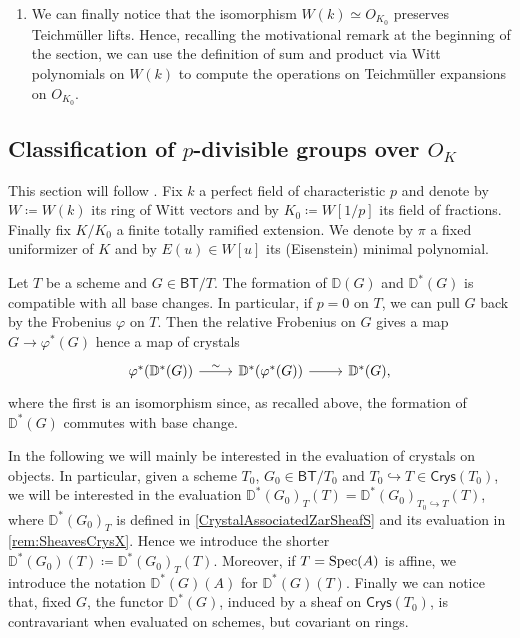 \begin{rem}[]
\begin{enumerate}
\item We can finally notice that the isomorphism $W(k) \simeq O_{K_0}$ preserves
	Teichmüller lifts. Hence, recalling the motivational remark at the beginning
	of the section, we can use the definition of sum and product via
	Witt polynomials on $W(k)$ to compute the operations on
	Teichmüller expansions on $O_{K_0}$.
\end{enumerate}
\end{rem}



\subsection{Classification of \texorpdfstring{$p$}{p}-divisible groups
	over \texorpdfstring{$O_{ K }$}{the ring of integers of K}}
	\label{Sec:ClassificationBT/OK}
This section will follow \cite[Appendix A]{Kisin}.
Fix $k$ a perfect field of characteristic $p$ and denote by
$W \coloneqq W(k)$ its ring of Witt vectors and by $K_0 \coloneqq W[1/p]$
its field of fractions.
Finally fix $K/K_0$ a finite totally ramified extension.
We denote by $\pi$ a fixed uniformizer of $K$ and by $E(u) \in W[u]$
its (Eisenstein) minimal polynomial.


\begin{rem}[]
	Let $T$ be a scheme and $G \in \mathsf{BT}/T$.
	The formation of $\mathbb{D}(G)$ and $\mathbb{D}^*(G)$ is compatible with all base changes.
	In particular, if $p = 0$ on $T$, we can pull $G$ back by the Frobenius $\varphi$ on $T$.
	Then the relative Frobenius on $G$ gives a map $G \to \varphi^*(G)$
	hence a map of crystals
	\begin{equation*}
	\begin{tikzcd}
		\varphi^* (\mathbb{D}^*(G)) \arrow[r, "\sim", rightarrow] &
		\mathbb{D}^*(\varphi^*(G)) \arrow[r, "", rightarrow] &
		\mathbb{D}^*(G)
	,\end{tikzcd}
	\end{equation*}
	where the first is an isomorphism since, as recalled above, the formation of
	$\mathbb{D}^*(G)$ commutes with base change.
\end{rem}


\begin{ntt}[]
	In the following we will mainly be interested in the evaluation of
	crystals on objects.
	In particular, given a scheme $T_0$, $G_0 \in \mathsf{BT}/T_0$ and 
	$T_0 \hookrightarrow T \in \mathsf{Crys}(T_0)$, we will be interested in the
	evaluation $\mathbb{D}^*(G_0)_{T}(T) = \mathbb{D}^*(G_0)_{T_0 \hookrightarrow T}(T)$,
	where $\mathbb{D}^*(G_0)_T$ is defined in \cref{CrystalAssociatedZarSheafS}
	and its evaluation in \cref{rem:SheavesCrysX}.
	Hence we introduce the shorter
	$\mathbb{D}^*(G_0)(T) \coloneqq \mathbb{D}^*(G_0)_T(T)$.
	Moreover, if $T = \operatorname{Spec}(A)$ is affine, we introduce the notation
	$\mathbb{D}^*(G)(A)$ for $\mathbb{D}^*(G)(T)$.
	Finally we can notice that, fixed $G$, the functor $\mathbb{D}^*(G)$,
	induced by a sheaf on $\mathsf{Crys}(T_0)$,
	is contravariant when evaluated on schemes, but covariant on rings.
\end{ntt}


